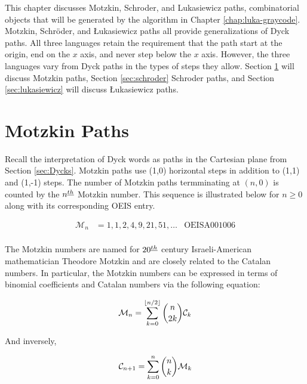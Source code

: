
This chapter discusses Motzkin, Schroder, and Lukasiewicz paths, combinatorial objects that will be generated by the algorithm in Chapter \ref{chap:luka-graycode}.
Motzkin, Schröder, and Łukasiewicz paths all provide generalizations of Dyck paths.  
All three languages retain the requirement that the path start at the origin, end on the $x$ axis, and never step below the $x$ axis.  However, the three languages vary from Dyck paths in the types of steps they allow.  Section \ref{sec:motzkin} will discuss Motzkin paths, Section \ref{sec:schroder} Schroder paths, and Section \ref{sec:lukasiewicz} will discuss Łukasiewicz paths.

\section{Motzkin Paths}\label{sec:motzkin}
Recall the interpretation of Dyck words as paths in the Cartesian plane from Section \ref{sec:Dycks}.
Motzkin paths use (1,0) horizontal steps in addition to (1,1) and (1,-1) steps. 
The number of Motzkin paths termminating at $(n,0)$ is counted by the $n^{\underline{th}}$ Motzkin number.  This sequence is illustrated below for $n \ge 0$ along with its corresponding OEIS entry.


\begin{align}
\mathcal{M}_n &= 1, 1, 2, 4, 9, 21, 51, \ldots  & \text{OEIS} \text{A}001006 \\
\end{align}

The Motzkin numbers are named for $20^{\underline{th}}$ century Israeli-American mathematician Theodore Motzkin and are closely related to the Catalan numbers.  In particular, the Motzkin numbers can be expressed in terms of binomial coefficients and Catalan numbers via the following equation:

\begin{equation}
	\mathcal{M}_n = \sum_{k=0}^{\lfloor n/2 \rfloor} {n \choose 2k}\mathcal{C}_k
\end{equation}

And inversely, 

\begin{equation}
	\mathcal{C}_{n+1} = \sum_{k=0}^{n} {n \choose k}\mathcal{M}_k
\end{equation}

